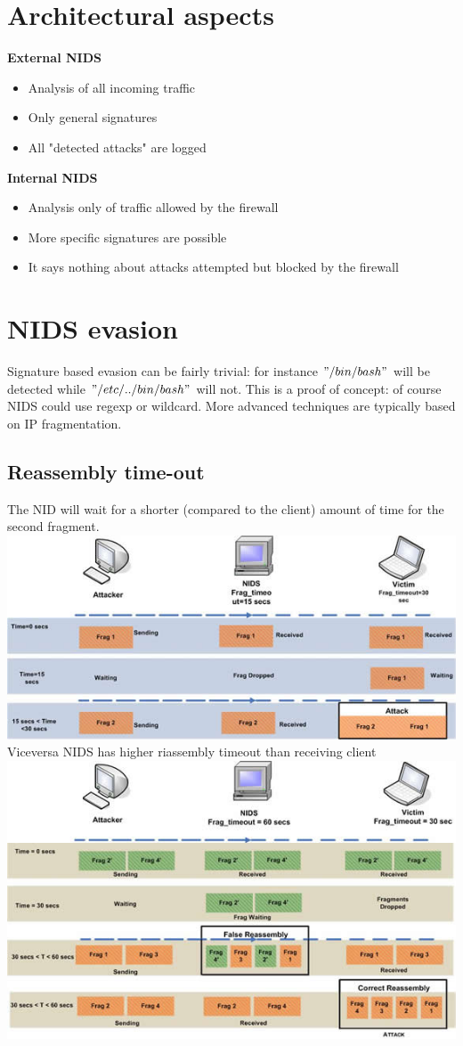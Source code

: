 \documentclass[10pt,a4paper]{book}
\begin{document}
\section{Architectural aspects}
\textbf{External NIDS}
\begin{itemize}[noitemsep,nolistsep]
\item Analysis of all incoming traffic
\item Only general signatures 
\item All "detected attacks" are logged
\end{itemize}
\textbf{Internal NIDS}
\begin{itemize}[noitemsep,nolistsep]
\item Analysis only of traffic allowed by the firewall
\item More specific signatures are possible
\item It says nothing about attacks attempted but blocked by the firewall
\end{itemize}
\newpage
\section{NIDS evasion}
Signature based evasion can be fairly trivial: for instance $"/bin/bash"$ will be detected while $"/etc/../bin/bash"$ will not. This is a proof of concept: of course NIDS could use regexp or wildcard. More advanced techniques are typically based on IP fragmentation.
\subsection{Reassembly time-out}
The NID will wait for a shorter (compared to the client) amount of time for the second fragment.
\includegraphics{IDS-evasion/1.jpg}\\
Viceversa NIDS has higher riassembly timeout than receiving client\\
\includegraphics{IDS-evasion/2.jpg}
\end{document}
